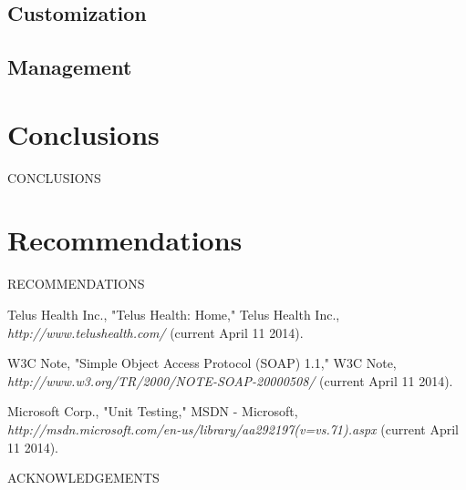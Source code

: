 \documentclass[12pt]{article}
\begin{document}
\subsection{Customization}
\subsection{Management}


\section{Conclusions}
CONCLUSIONS


\section{Recommendations}
RECOMMENDATIONS


\newpage



\begin{thebibliography}{1}

   Telus Health Inc., "Telus Health: Home," Telus Health Inc., {\em http://www.telushealth.com/} (current April 11 2014).

   W3C Note, "Simple Object Access Protocol (SOAP) 1.1," W3C Note, {\em http://www.w3.org/TR/2000/NOTE-SOAP-20000508/} (current April 11 2014).

 Microsoft Corp., "Unit Testing," MSDN - Microsoft, {\em http://msdn.microsoft.com/en-us/library/aa292197(v=vs.71).aspx} (current April 11 2014).

\end{thebibliography}
\newpage


ACKNOWLEDGEMENTS
\newpage


\end{document}
